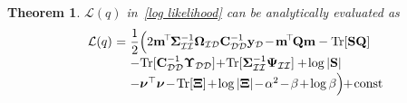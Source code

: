 \documentclass[conference]{IEEEtran}
\newtheorem{theorem}{Theorem}
\begin{document}
%			
\begin{theorem}
$\mathcal{L}(q)$ in~\eqref{log likelihood} can be analytically evaluated as \vspace{-0mm} 
\begin{equation}
\hspace{-0mm}
\begin{array}{rcl}
\mathcal{L}(q) &\hspace{-2.4mm}= &\hspace{-2.4mm}\displaystyle\frac{1}{2}\Big(2\mathbf{m}^{\hspace{-0.5mm}\top}\hspace{-0.5mm}\mathbf{\Sigma}_\mathcal{II}^{-1}\mathbf{\Omega}_\mathcal{ID}\mathbf{C}_\mathcal{DD}^{-1}\mathbf{y}_\mathcal{D}\hspace{-0.5mm}-\hspace{-0.5mm}\mathbf{m}^{\hspace{-0.5mm}\top}\hspace{-0.5mm}\mathbf{Q}\mathbf{m} -\mathrm{Tr}[\mathbf{S}\mathbf{Q}]\vspace{0.5mm}
\\
&&\hspace{-2.4mm}-\hspace{0mm}\mathrm{Tr}[\mathbf{C}_\mathcal{DD}^{-1}\mathbf{\Upsilon}_\mathcal{DD}]\hspace{-0.7mm}+\hspace{-0.7mm}\mathrm{Tr}[\mathbf{\Sigma}_\mathcal{II}^{-1}\mathbf{\Psi}_\mathcal{II}] +\hspace{-0.5mm}\log|\mathbf{S}|\vspace{0.5mm}
\\
&&\hspace{-2.4mm}-\boldsymbol{\nu}^\top\boldsymbol{\nu}\hspace{-0.5mm}-\hspace{-0.5mm}\mathrm{Tr}[\mathbf{\Xi}]\hspace{-0.5mm}+\hspace{-0.5mm}\log|\mathbf{\Xi}|\hspace{-0.5mm}-\hspace{-0.5mm}\alpha^2\hspace{-0.5mm} -\hspace{-0.5mm} \beta\hspace{-0.5mm} +\hspace{-0.5mm} \log\beta\Big)\hspace{-1mm}+\hspace{-0.5mm}\mathrm{const}\vspace{0mm} 

\end{array}
\end{equation}
\end{theorem}
\end{document}
